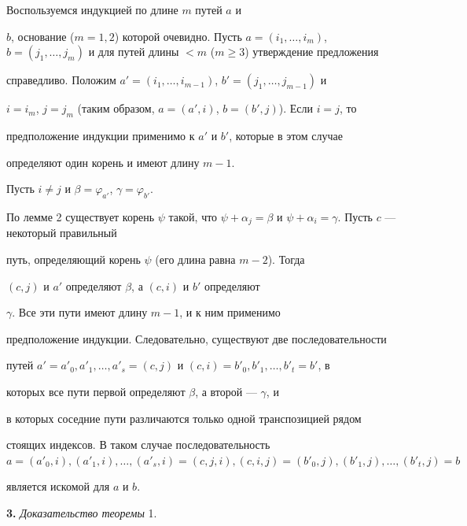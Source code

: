\begin{pf}


Воспользуемся индукцией по длине $m$ путей $a$ и


$b$, основание ($m=1,2$) которой очевидно. Пусть $a=(i_1,\dotsc,i_m)$, $b=


(j_1,\dotsc,j_m)$ и для путей длины $<m$ ($m\ge 3$) утверждение предложения


справедливо. Положим $a'=(i_1,\dotsc,i_{m-1})$, $b'=(j_1,\dotsc,j_{m-1})$ и


$i=i_m$, $j=j_m$ (таким образом, $a=(a',i)$, $b=(b',j)$). Если $i=j$, то


предположение индукции применимо к $a'$ и $b'$, которые в этом случае


определяют один корень и имеют длину $m-1$.





Пусть $i\ne j$ и $\beta =\varphi_{a'}$, $\gamma =\varphi_{b'}$.


По лемме 2 существует корень $\psi $ такой, что $\psi +\alpha_j=


\beta $ и $\psi +\alpha_i=\gamma $. Пусть $c$ --- некоторый правильный


путь, определяющий корень $\psi $ (его длина равна $m-2$). Тогда


$(c,j)$ и $a'$ определяют $\beta $, а $(c,i)$ и $b'$ определяют


$\gamma $. Все эти пути имеют длину $m-1$, и к ним применимо


предположение индукции. Следовательно, существуют две последовательности


путей $a'=a'_0,a'_1,\dotsc,a'_s=(c,j)$ и $(c,i)=b'_0,b'_1,\dotsc,b'_t=b'$, в


которых все пути первой определяют $\beta $, а второй --- $\gamma $, и


в которых соседние пути различаются только одной транспозицией рядом


стоящих индексов. В таком случае последовательность $a=(a'_0,i),


(a'_1,i),\dotsc,(a'_s,i)=


(c,j,i),(c,i,j)=(b'_0,j),(b'_1,j),\dotsc,(b'_t,j)=b$


является искомой для $a$ и $b$.


\end{pf}





{\bf 3.} {\it Доказательство теоремы} 1.






